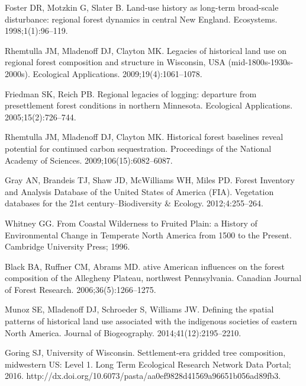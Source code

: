 \documentclass[10pt,letterpaper]{article}
\begin{document}
\begin{thebibliography}{10}
Foster DR, Motzkin G, Slater B.
\newblock Land-use history as long-term broad-scale disturbance: regional
  forest dynamics in central {N}ew {England}.
\newblock Ecosystems. 1998;1(1):96--119.

Rhemtulla JM, Mladenoff DJ, Clayton MK.
\newblock Legacies of historical land use on regional forest composition and
  structure in {W}isconsin, {USA} (mid-1800{s}-1930{s}-2000{s}).
\newblock Ecological Applications. 2009;19(4):1061--1078.

Friedman SK, Reich PB.
\newblock Regional legacies of logging: departure from presettlement forest
  conditions in northern {M}innesota.
\newblock Ecological Applications. 2005;15(2):726--744.

Rhemtulla JM, Mladenoff DJ, Clayton MK.
\newblock Historical forest baselines reveal potential for continued carbon
  sequestration.
\newblock Proceedings of the National Academy of Sciences.
  2009;106(15):6082--6087.

Gray AN, Brandeis TJ, Shaw JD, McWilliams WH, Miles PD.
\newblock Forest Inventory and Analysis Database of the {United States} of
  {America} ({FIA}).
\newblock Vegetation databases for the 21st century--Biodiversity \& Ecology.
  2012;4:255--264.

Whitney GG.
\newblock From Coastal Wilderness to Fruited Plain: a History of Environmental
  Change in Temperate {N}orth {A}merica from 1500 to the Present.
\newblock Cambridge University Press; 1996.

Black BA, Ruffner CM, Abrams MD.
ative {A}merican influences on the forest composition of the
  {A}llegheny {P}lateau, northwest {P}ennsylvania.
\newblock Canadian Journal of Forest Research. 2006;36(5):1266--1275.

Munoz SE, Mladenoff DJ, Schroeder S, Williams JW.
\newblock Defining the spatial patterns of historical land use associated with
  the indigenous societies of eastern {N}orth {A}merica.
\newblock Journal of Biogeography. 2014;41(12):2195--2210.

Goring SJ, {University of Wisconsin}.
\newblock Settlement-era gridded tree composition, midwestern {US}: Level 1.
\newblock Long Term Ecological Research Network Data Portal; 2016. http://dx.doi.org/10.6073/pasta/aa0ef9828d41569a96651b056ad89fb3.


\end{thebibliography}
\end{document}
